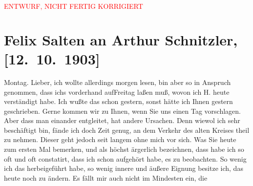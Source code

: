 
\begin{center}
            \textcolor{red}{ENTWURF, NICHT FERTIG KORRIGIERT}
                      \end{center}
            
         
         \renewcommand{\erwaehntePersonen}{Personen: Hugo von Hofmannsthal, Olga Schnitzler, Heinrich Schnitzler}
         \renewcommand{\erwaehnteOrte}{Orte: Wien}
         \renewcommand{\erwaehnteWerke}{}
               \section[Felix Salten an Arthur Schnitzler, {[}12. 10. 1903{]}]{ Felix Salten an Arthur Schnitzler, {[}12. 10. 1903{]}}\nopagebreak{}\rehead{ }\begin{ledgroupsized}[t]{13cm}\normalsize\beginnumbering \toendnotes[C]{\smallbreak\pagebreak[2]} 
\toendnotes[C]{\smallbreak}\pstart
           \raggedleft{}{\pb}Montag.\pend
           \pstart
           Lieber, ich wollte allerdings morgen lesen, bin aber so
               in Anspruch genommen, dass ichs vorderhand aufFreitag laßen muß, wovon
               ich H. heute verständigt habe. Ich wußte das
               schon gestern, sonst hätte ich Ihnen gestern geschrieben. Gerne kommen wir zu Ihnen,
               wenn Sie uns einen Tag vorschlagen. Aber dass man einander entgleitet, hat andere
               Ursachen. Denn wiewol ich sehr beschäftigt bin, fände ich doch Zeit genug, an dem
               Verkehr des alten Kreises theil zu nehmen. Dieser geht jedoch seit langem ohne mich
               vor sich. Was Sie heute zum ersten Mal bemerken, und als höchst ärgerlich bezeichnen,
               dass habe ich so oft und oft constatirt, dass ich schon aufgehört habe, es zu
               beobachten. So wenig ich das herbeigeführt habe, so wenig innere und äußere Eignung
               besitze ich, das heute noch zu ändern. Es fällt mir auch nicht im Mindesten ein, die

\end{ledgroupsized}
